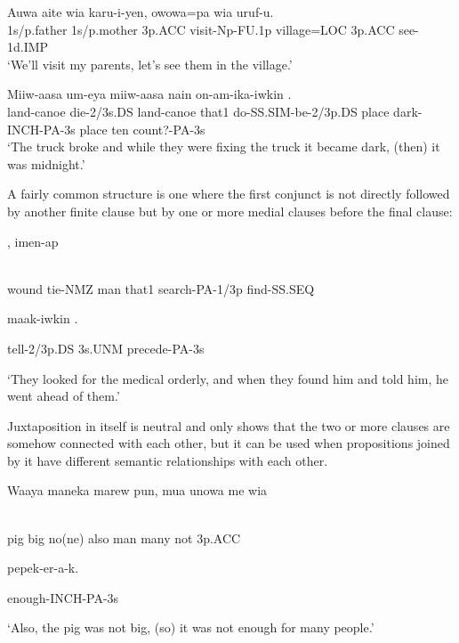 \ea%
\label{ex:x1370}
\gll Auwa  aite  wia  karu-i-yen,  owowa=pa wia  uruf-u.\\
1s/p.father  1s/p.mother  3p.ACC  visit-Np-FU.1p  village=LOC 3p.ACC  see-1d.IMP  \\
\glt `We'll visit my parents, let's see them in the village.'
\z


\ea%
\label{ex:x1369}
\gll Miiw-aasa  um-eya  miiw-aasa  nain  on-am-ika-iwkin  .
\\
land-canoe  die-2/3s.DS  land-canoe  that1  do-SS.SIM-be-2/3p.DS      place  dark-INCH-PA-3s  place  ten  count?-PA-3s\\
\glt `The truck broke and while they were fixing the truck it became dark, (then) it was midnight.'
\z

A fairly common structure is one where the first conjunct is not directly followed by another finite clause but by one or more medial clauses before the final clause:


\ea%
\label{ex:x1371}
\gll {}  ,  imen-ap  \\
      \\
\glt
\z

wound  tie-NMZ  man  that1  search-PA-1/3p  find-SS.SEQ

maak-iwkin  .

tell-2/3p.DS  3s.UNM  precede-PA-3s

`They looked for the medical orderly, and when they found him and told him, he went ahead of them.'

Juxtaposition in itself is neutral and only shows that the two or more clauses are somehow connected with each other, but it can be used when propositions joined by it have different semantic relationships with each other.

\ea%
\label{ex:x1404}
\gll Waaya  maneka  marew  pun,  mua  unowa  me  wia  \\
      \\
\glt
\z

pig  big  no(ne)  also  man  many  not  3p.ACC

pepek-er-a-k.

enough-INCH-PA-3s

 `Also, the pig was not big, (so) it was not enough for many people.'

